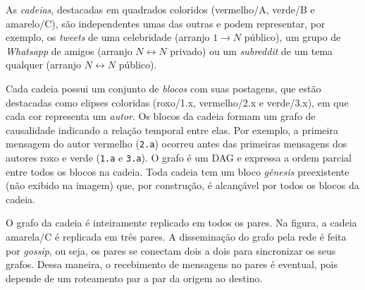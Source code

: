\documentclass[12pt]{article}
\newcommand{\Xon} {$1{\rightarrow}N$\xspace}
\newcommand{\Xnn} {$N{\leftrightarrow}N$\xspace}
\begin{document}
As \emph{cadeias}, destacadas em quadrados coloridos (vermelho/A, verde/B e
amarelo/C), são independentes umas das outras e podem representar, por exemplo,
os \emph{tweets} de uma celebridade (arranjo \Xon público), um grupo de
\emph{Whatsapp} de amigos (arranjo \Xnn privado) ou um \emph{subreddit} de um
tema qualquer (arranjo \Xnn público).

Cada cadeia possui um conjunto de \emph{blocos} com suas postagens, que estão
destacadas como elipses coloridas (roxo/1.x, vermelho/2.x e verde/3.x), em que
cada cor representa um \emph{autor}.
Os blocos da cadeia formam um grafo de causalidade indicando a relação temporal
entre elas.
Por exemplo, a primeira mensagem do autor vermelho (\texttt{2.a}) ocorreu antes
das primeiras mensagens dos autores roxo e verde (\texttt{1.a} e \texttt{3.a}).
O grafo é um DAG e expressa a ordem parcial entre todos os blocos na cadeia.
Toda cadeia tem um bloco \emph{gênesis} preexistente (não exibido na imagem)
que, por construção, é alcançável por todos os blocos da cadeia.

O grafo da cadeia é inteiramente replicado em todos os pares.
Na figura, a cadeia amarela/C é replicada em três pares.
A disseminação do grafo pela rede é feita por \emph{gossip}, ou seja, os pares
se conectam dois a dois para sincronizar os seus grafos.
Dessa maneira, o recebimento de mensagens no pares é eventual, pois depende de
um roteamento par a par da origem ao destino.
\end{document}
